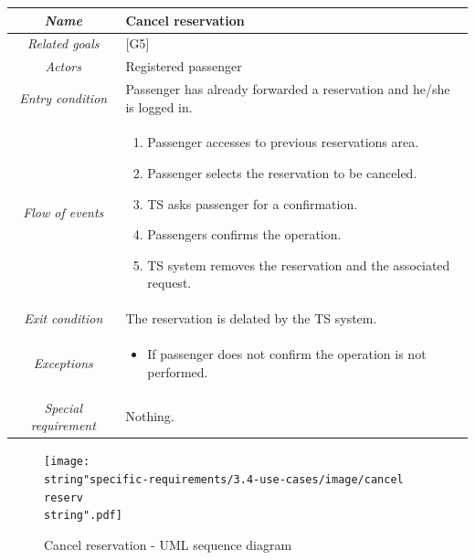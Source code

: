 \begin{flushleft}
\begin{tabular}{c|>{\centering}p{10cm}}
\hline 
\emph{Name } & \raggedright{}Cancel reservation\tabularnewline
\hline 
\emph{Related goals} & \raggedright{}{[}G5{]}\tabularnewline
\hline 
\emph{Actors} & \raggedright{}Registered passenger\tabularnewline
\hline 
\emph{Entry condition} & \raggedright{}Passenger has already forwarded a reservation and he/she
is logged in.\tabularnewline
\hline 
\emph{Flow of events} & \begin{enumerate}
\item \begin{raggedright}
Passenger accesses to previous reservations area.
\par\end{raggedright}
\item \begin{raggedright}
Passenger selects the reservation to be canceled.
\par\end{raggedright}
\item \begin{raggedright}
TS asks passenger for a confirmation.
\par\end{raggedright}
\item \begin{raggedright}
Passengers confirms the operation.
\par\end{raggedright}
\item \raggedright{}TS system removes the reservation and the associated
request.\end{enumerate}
\tabularnewline
\hline 
\emph{Exit condition} & \raggedright{}The reservation is delated by the TS system.\tabularnewline
\hline 
\emph{Exceptions} & \begin{itemize}
\item \raggedright{}If passenger does not confirm the operation is not performed.\end{itemize}
\tabularnewline
\hline 
\emph{Special requirement} & \raggedright{}Nothing.\tabularnewline
\hline 
\end{tabular}
\par\end{flushleft}

\clearpage{}

\begin{landscape}

\begin{figure}[H]
\begin{centering}
\texttt{[image: \\string"specific-requirements/3.4-use-cases/image/cancel reserv\\string".pdf]}
\par\end{centering}

\protect\caption{Cancel reservation - UML sequence diagram}
\end{figure}


\end{landscape}

